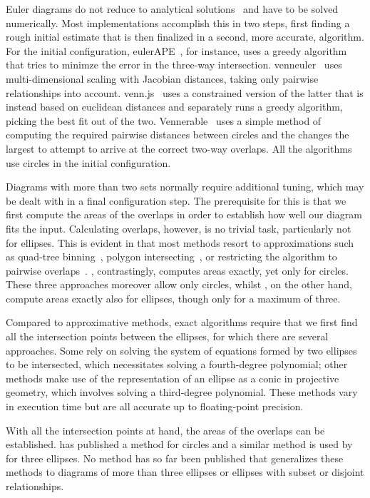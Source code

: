 \documentclass[
  oneside,
  openany,
  numbers=noendperiod,
  parskip=half,
  bibliography=totoc
]{scrbook}\usepackage[]{graphicx}\usepackage{xcolor}
\newcommand{\pkg}[1]{{\fontseries{b}\selectfont #1}}
\begin{document}
Euler diagrams do not reduce to analytical solutions~\citep{chow_2007} and have
to be solved numerically. Most implementations accomplish this in two steps,
first finding a rough initial estimate that is then finalized in a second, more
accurate, algorithm. For the initial configuration,
\pkg{eulerAPE}~\citep{micallef_2013}, for instance, uses a greedy algorithm that
tries to minimze the error in the three-way intersection.
\pkg{venneuler}~\citep{wilkinson_2012} uses multi-dimensional scaling with
Jacobian distances, taking only pairwise relationships into account.
\pkg{venn.js}~\citet{frederickson_2016} uses a constrained version of the latter
that is instead based on euclidean distances and separately runs a greedy
algorithm, picking the best fit out of the two.
\pkg{Vennerable}~\citet{swinton_2011} uses a simple method of computing the
required pairwise distances between circles and the changes the largest to
attempt to arrive at the correct two-way overlaps. All the algorithms use
circles in the initial configuration.

Diagrams with more than two sets normally require additional tuning, which may
be dealt with in a final configuration step. The prerequisite for this is that
we first compute the areas of the overlaps in order to establish how well our
diagram fits the input. Calculating overlaps, however, is no trivial task,
particularly not for ellipses. This is evident in that most methods resort to
approximations such as quad-tree binning~\citep{wilkinson_2012}, polygon
intersecting~\citep{kestler_2008}, or restricting the algorithm to pairwise
overlaps~\citep{swinton_2011}. \citet{frederickson_2016}, contrastingly,
computes areas exactly, yet only for circles. These three approaches moreover allow only
circles, whilst \citet{micallef_2013}, on the other hand, compute areas exactly
also for ellipses, though only for a maximum of three.

Compared to approximative methods, exact algorithms require that we
first find all the intersection points between the ellipses, for which there are
several approaches. Some rely on solving the system of equations formed by two
ellipses to be intersected, which necessitates solving a fourth-degree
polynomial; other methods make use of the representation of an ellipse as a
conic in projective geometry, which involves solving a third-degree polynomial.
These methods vary in execution time but are all accurate up to
floating-point precision.

With all the intersection points at hand, the areas of the overlaps can be
established. \citet{frederickson_2013} has published a method for circles
and a similar method is used by \citet{micallef_2013} for three ellipses. No
method has so far been published that
generalizes these methods to diagrams of more than three ellipses or ellipses
with subset or disjoint relationships.
\end{document}
